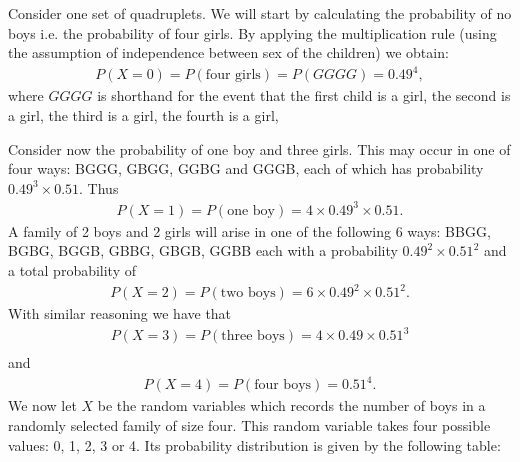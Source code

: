 \documentclass[letterpaper,10pt,english]{jupyterBook}
\begin{document}
\sphinxAtStartPar
Consider one set of quadruplets. We will start by calculating the probability of no boys i.e. the probability of four girls. By applying the multiplication rule (using the assumption of independence between sex of the children) we obtain:
\begin{equation*}
\begin{split}
P(X=0) = P(\mbox{four girls}) = P(GGGG) = 0.49^4,
\end{split}
\end{equation*}
\sphinxAtStartPar
where \(GGGG\) is shorthand for the event that the first child is a girl,  the second is a girl,  the third is a girl,  the fourth is a girl,

\sphinxAtStartPar
Consider now the probability of one boy and three girls.  This may occur in one of four ways:
BGGG, GBGG, GGBG and GGGB, each of which has probability \(0.49^3\times 0.51\).  Thus
\begin{equation*}
\begin{split}
P(X=1) = P(\mbox{one boy}) = 4 \times 0.49^3 \times 0.51.
\end{split}
\end{equation*}
\sphinxAtStartPar
A family of 2 boys and 2 girls will arise in one of the following 6 ways: BBGG, BGBG, BGGB, GBBG, GBGB, GGBB each with a probability \(0.49^2 \times 0.51^2\) and a total probability of
\begin{equation*}
\begin{split}
P(X=2) =  P(\mbox{two boys}) = 6 \times 0.49^2 \times 0.51^2.
\end{split}
\end{equation*}
\sphinxAtStartPar
With similar reasoning we have that
\begin{equation*}
\begin{split}
P(X=3) =  P(\mbox{three boys}) = 4 \times 0.49 \times 0.51^3 \\
\end{split}
\end{equation*}
\sphinxAtStartPar
and
\begin{equation*}
\begin{split}
P(X=4) =  P(\mbox{four boys}) = 0.51^4.
\end{split}
\end{equation*}
\sphinxAtStartPar
We now let \(X\) be the random variables which records the number of boys in a randomly selected family of size four. This random variable takes four possible values: 0, 1, 2, 3 or 4. Its probability distribution is given by the following table:
\end{document}
